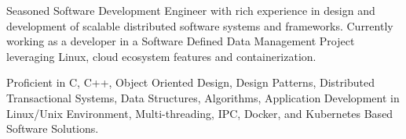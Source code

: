 

\begin{cvparagraph}

Seasoned Software Development Engineer with rich experience in design and development of scalable distributed software systems and frameworks. Currently working as a developer in a Software Defined Data Management Project leveraging Linux, cloud ecosystem features and containerization.

Proficient in C, C++, Object Oriented Design, Design Patterns, Distributed Transactional Systems, Data Structures, Algorithms, Application Development in Linux/Unix Environment, Multi-threading, IPC, Docker, and Kubernetes Based Software Solutions.
\end{cvparagraph}
